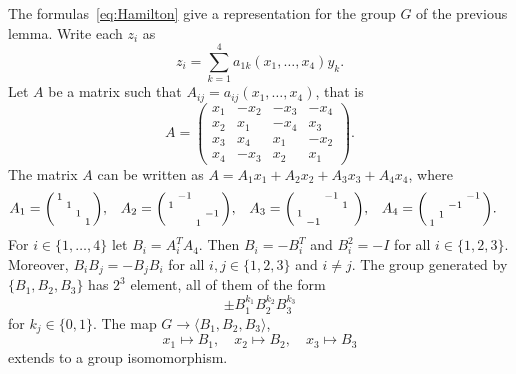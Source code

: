  \begin{example}
 	The formulas~\eqref{eq:Hamilton} give a representation for the
 	group $G$ of the previous lemma. Write each $z_i$ as 
 	\[
    z_i=\sum_{k=1}^4a_{1k}(x_1,\dots,x_4)y_k.
    \]
    Let $A$ be a matrix
 	such that 
 	$A_{ij}=a_{ij}(x_1,\dots,x_4)$, that is 
 	\[
 		A=\begin{pmatrix}
 			x_1 & -x_2 & -x_3 & -x_4\\
 			x_2 & x_1 & -x_4 & x_3\\
 			x_3 & x_4 & x_1 & -x_2\\
 			x_4 & -x_3 & x_2 & x_1
 		\end{pmatrix}.
 	\]
 	The matrix $A$ can be written as $A=A_1x_1+A_2x_2+A_3x_3+A_4x_4$, where
 	\begin{align*}
 		&A_1=\begin{psmallmatrix}
 		1\\
 		&1\\
 		&&1\\
 		&&&1\\
 		\end{psmallmatrix},
 		&&
 		A_2=\begin{psmallmatrix}
 			& -1\\
 			1 \\
 			&&&-1\\
 			&&1
 		\end{psmallmatrix},
 		&&
 		A_3=\begin{psmallmatrix}
 			&& -1 \\
 			&&&1 & \\
 			1\\
 			&-1
 		  \end{psmallmatrix},
 		  &&
 		  A_4=\begin{psmallmatrix}
 			&&&-1\\
 			&&-1\\
 			&1\\
 			1
 		\end{psmallmatrix}.
 	\end{align*}
 	For $i\in\{1,\dots,4\}$ let $B_i=A_i^TA_4$. Then
 	$B_i=-B_i^T$ and  $B_i^2=-I$ 
 	for all $i\in\{1,2,3\}$. Moreover, $B_iB_j=-B_jB_i$ for all $i,j\in\{1,2,3\}$ and
 	$i\ne j$.  
 	The group generated by $\{B_1,B_2,B_3\}$ has $2^3$ element, all of them
 	of the form
 	\[
 		\pm B_1^{k_1}B_2^{k_2}B_3^{k_3}
 	\]
 	for $k_j\in\{0,1\}$. 
     The map 
 	$G\to\langle B_1,B_2,B_3\rangle$,
 	\[
 		x_1\mapsto B_1,\quad
 		x_2\mapsto B_2,\quad
 		x_3\mapsto B_3 
 	\]
 	extends to a group isomomorphism. 
 \end{example}

